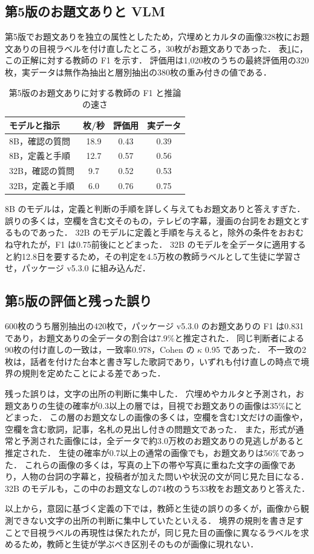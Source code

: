 \subsection{第5版のお題文ありと VLM}
第5版でお題文ありを独立の属性としたため，穴埋めとカルタの画像328枚にお題文ありの目視ラベルを付け直したところ，30枚がお題文ありであった．
表\ref{tab_qwen_v5}に，この正解に対する教師の F1 を示す．
評価用は1,020枚のうちの最終評価用の320枚，実データは無作為抽出と層別抽出の380枚の重み付きの値である．

\begin{table}[t]
    \centering
    \caption{第5版のお題文ありに対する教師の F1 と推論の速さ}
    \label{tab_qwen_v5}
    \small
    \begin{tabular}{lccc}
        \toprule
        モデルと指示 & 枚/秒 & 評価用 & 実データ \\
        \midrule
        8B，確認の質問 & 18.9 & 0.43 & 0.39 \\
        8B，定義と手順 & 12.7 & 0.57 & 0.56 \\
        32B，確認の質問 & 9.7 & 0.52 & 0.53 \\
        32B，定義と手順 & 6.0 & 0.76 & 0.75 \\
        \bottomrule
    \end{tabular}
\end{table}

8B のモデルは，定義と判断の手順を詳しく与えてもお題文ありと答えすぎた．
誤りの多くは，空欄を含む文そのもの，テレビの字幕，漫画の台詞をお題文とするものであった．
32B のモデルに定義と手順を与えると，除外の条件をおおむね守れたが，F1 は0.75前後にとどまった．
32B のモデルを全データに適用すると約12.8日を要するため，その判定を4.5万枚の教師ラベルとして生徒に学習させ，パッケージ v5.3.0 に組み込んだ．

\subsection{第5版の評価と残った誤り}
600枚のうち層別抽出の420枚で，パッケージ v5.3.0 のお題文ありの F1 は0.831であり，お題文ありの全データの割合は7.9\%と推定された．
同じ判断者による90枚の付け直しの一致は，一致率0.978，Cohen の $ \kappa $\cite{ref_kappa} 0.95 であった．
不一致の2枚は，話者を付けた台本と書き写した歌詞であり，いずれも付け直しの時点で境界の規則を定めたことによる差であった．

残った誤りは，文字の出所の判断に集中した．
穴埋めやカルタと予測され，お題文ありの生徒の確率が0.3以上の層では，目視でお題文ありの画像は35\%にとどまった．
この層のお題文なしの画像の多くは，空欄を含む1文だけの画像や，空欄を含む歌詞，記事，名札の見出し付きの問題文であった．
また，形式が通常と予測された画像には，全データで約3.0万枚のお題文ありの見逃しがあると推定された．
生徒の確率が0.7以上の通常の画像でも，お題文ありは56\%であった．
これらの画像の多くは，写真の上下の帯や写真に重ねた文字の画像であり，人物の台詞の字幕と，投稿者が加えた問いや状況の文が同じ見た目になる．
32B のモデルも，この中のお題文なしの74枚のうち33枚をお題文ありと答えた．

以上から，意図に基づく定義の下では，教師と生徒の誤りの多くが，画像から観測できない文字の出所の判断に集中していたといえる．
境界の規則を書き足すことで目視ラベルの再現性は保たれたが，同じ見た目の画像に異なるラベルを求めるため，教師と生徒が学ぶべき区別そのものが画像に現れない．
